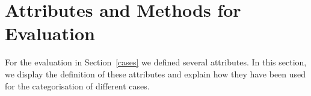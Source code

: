 % 
% 
% 
% 
% 
% 
% 
% 
% 
% 
% 
% 

\chapter{Attributes and Methods for Evaluation}
For the evaluation in Section~\ref{cases} we defined several attributes. In this section, we display the definition of these attributes
and explain how they have been used for the categorisation
of different cases. 
